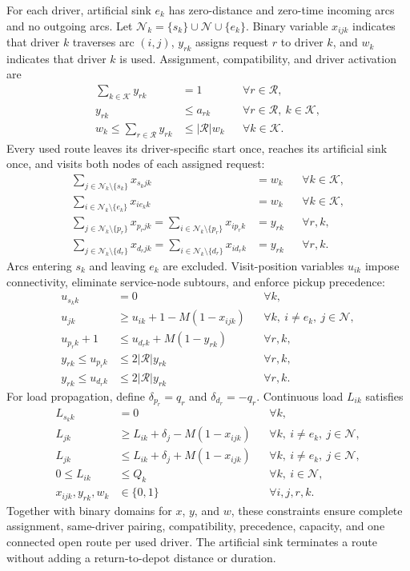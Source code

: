\documentclass[11pt,a4paper]{article}
\newcommand{\R}{\mathcal{R}}
\newcommand{\K}{\mathcal{K}}
\begin{document}
For each driver, artificial sink $e_k$ has zero-distance and zero-time incoming
arcs and no outgoing arcs. Let
$\mathcal{N}_k=\{s_k\}\cup\mathcal{N}\cup\{e_k\}$. Binary variable
$x_{ijk}$ indicates that driver $k$ traverses arc $(i,j)$,
$y_{rk}$ assigns request $r$ to driver $k$, and $w_k$ indicates that driver
$k$ is used. Assignment, compatibility, and driver activation are
\begin{align}
 \sum_{k\in\K}y_{rk}&=1 &&\forall r\in\R,\\
 y_{rk}&\le a_{rk} &&\forall r\in\R,\ k\in\K,\\
 w_k\le\sum_{r\in\R}y_{rk}&\le|\R|w_k &&\forall k\in\K.
\end{align}
Every used route leaves its driver-specific start once, reaches its artificial
sink once, and visits both nodes of each assigned request:
\begin{align}
 \sum_{j\in\mathcal{N}_k\setminus\{s_k\}}x_{s_kjk}
   &=w_k &&\forall k\in\K,\\
 \sum_{i\in\mathcal{N}_k\setminus\{e_k\}}x_{ie_kk}
   &=w_k &&\forall k\in\K,\\
 \sum_{j\in\mathcal{N}_k\setminus\{p_r\}}x_{p_rjk}
 =\sum_{i\in\mathcal{N}_k\setminus\{p_r\}}x_{ip_rk}
   &=y_{rk} &&\forall r,k,\\
 \sum_{j\in\mathcal{N}_k\setminus\{d_r\}}x_{d_rjk}
 =\sum_{i\in\mathcal{N}_k\setminus\{d_r\}}x_{id_rk}
   &=y_{rk} &&\forall r,k.
\end{align}
Arcs entering $s_k$ and leaving $e_k$ are excluded. Visit-position variables
$u_{ik}$ impose connectivity, eliminate service-node subtours, and enforce
pickup precedence:
\begin{align}
 u_{s_kk}&=0 &&\forall k,\\
 u_{jk}&\ge u_{ik}+1-M(1-x_{ijk})
   &&\forall k,\ i\ne e_k,\ j\in\mathcal{N},\\
 u_{p_rk}+1&\le u_{d_rk}+M(1-y_{rk})
   &&\forall r,k,\\
 y_{rk}\le u_{p_rk}&\le 2|\R|y_{rk}
   &&\forall r,k,\\
 y_{rk}\le u_{d_rk}&\le 2|\R|y_{rk}
   &&\forall r,k.
\end{align}
For load propagation, define $\delta_{p_r}=q_r$ and
$\delta_{d_r}=-q_r$. Continuous load $L_{ik}$ satisfies
\begin{align}
 L_{s_kk}&=0 &&\forall k,\\
 L_{jk}&\ge L_{ik}+\delta_j-M(1-x_{ijk})
   &&\forall k,\ i\ne e_k,\ j\in\mathcal{N},\\
 L_{jk}&\le L_{ik}+\delta_j+M(1-x_{ijk})
   &&\forall k,\ i\ne e_k,\ j\in\mathcal{N},\\
 0\le L_{ik}&\le Q_k &&\forall k,\ i\in\mathcal{N},\\
 x_{ijk},y_{rk},w_k&\in\{0,1\} &&\forall i,j,r,k.
\end{align}
Together with binary domains for $x$, $y$, and $w$, these constraints ensure
complete assignment, same-driver pairing, compatibility, precedence,
capacity, and one connected open route per used driver. The artificial sink
terminates a route without adding a return-to-depot distance or duration.
\end{document}
